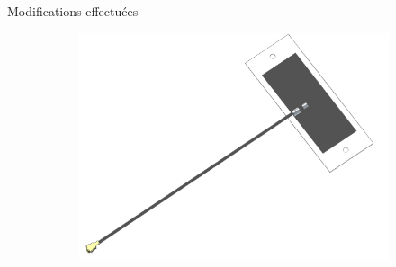 \documentclass{beamer}
\begin{document}
\begin{frame}{Modifications effectuées}
\begin{figure}
\begin{subfigure}[b]{0.3\textwidth}
		\end{subfigure}
		\hfill
		\begin{subfigure}[b]{0.3\textwidth}
			\centering
			\includegraphics[width=1\linewidth, center]{../figures/presentation/antenne-flex}
		\end{subfigure}
		\hfill
	\end{figure}	
\end{frame}
\end{document}
